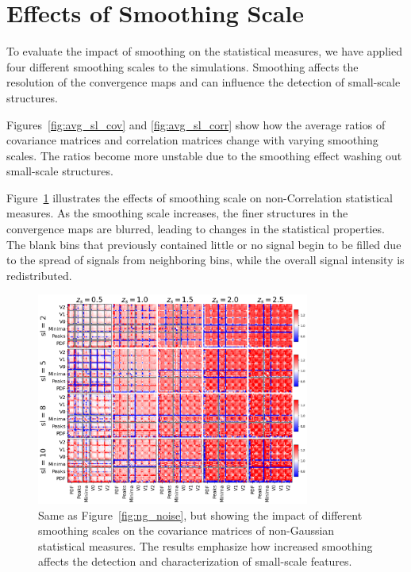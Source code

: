 \section{Effects of Smoothing Scale}
To evaluate the impact of smoothing on the statistical measures, we have applied four different smoothing scales to the simulations. Smoothing affects the resolution of the convergence maps and can influence the detection of small-scale structures.

Figures~\ref{fig:avg_sl_cov} and \ref{fig:avg_sl_corr} show how the average ratios of covariance matrices and correlation matrices change with varying smoothing scales. The ratios become more unstable due to the smoothing effect washing out small-scale structures.

Figure~\ref{fig:ng_smoothing} illustrates the effects of smoothing scale on non-Correlation statistical measures. As the smoothing scale increases, the finer structures in the convergence maps are blurred, leading to changes in the statistical properties. The blank bins that previously contained little or no signal begin to be filled due to the spread of signals from neighboring bins, while the overall signal intensity is redistributed.

\begin{figure}
    \centering
    \includegraphics[width=0.8\textwidth]{figures/results/nongaussian_cov_sl.png}
    \caption{Same as Figure~\ref{fig:ng_noise}, but showing the impact of different smoothing scales on the covariance matrices of non-Gaussian statistical measures. The results emphasize how increased smoothing affects the detection and characterization of small-scale features.}
    \label{fig:ng_smoothing}
\end{figure}